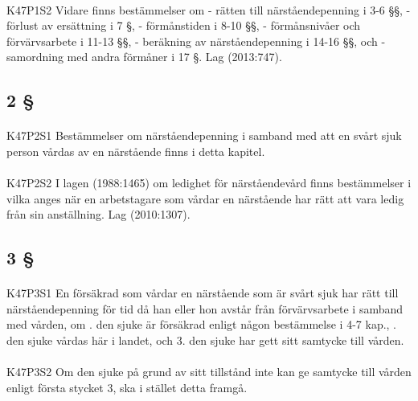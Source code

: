 \documentclass[a4paper,notitlepage,openany,10pt]{book}
\begin{document}
\paragraph*{}
{\tiny K47P1S2}
Vidare finns bestämmelser om
\newline - rätten till närståendepenning i 3-6 §§,
\newline - förlust av ersättning i 7 §,
\newline - förmånstiden i 8-10 §§,
\newline - förmånsnivåer och förvärvsarbete i 11-13 §§,
\newline - beräkning av närståendepenning i 14-16 §§, och
\newline - samordning med andra förmåner i 17 §.
Lag (2013:747).
\subsection*{2 §}
\paragraph*{}
{\tiny K47P2S1}
Bestämmelser om närståendepenning i samband med att en svårt sjuk person vårdas av en närstående finns i detta kapitel.
\paragraph*{}
{\tiny K47P2S2}
I lagen (1988:1465) om ledighet för närståendevård finns bestämmelser i vilka anges när en arbetstagare som vårdar en närstående har rätt att vara ledig från sin anställning.
Lag (2010:1307).
\subsection*{3 §}
\paragraph*{}
{\tiny K47P3S1}
En försäkrad som vårdar en närstående som är svårt sjuk har rätt till närståendepenning för tid då han eller hon avstår från förvärvsarbete i samband med vården, om
. den sjuke är försäkrad enligt någon bestämmelse i 4-7 kap.,
. den sjuke vårdas här i landet, och 3. den sjuke har gett sitt samtycke till vården.
\paragraph*{}
{\tiny K47P3S2}
Om den sjuke på grund av sitt tillstånd inte kan ge samtycke till vården enligt första stycket 3, ska i stället detta framgå.
\end{document}
